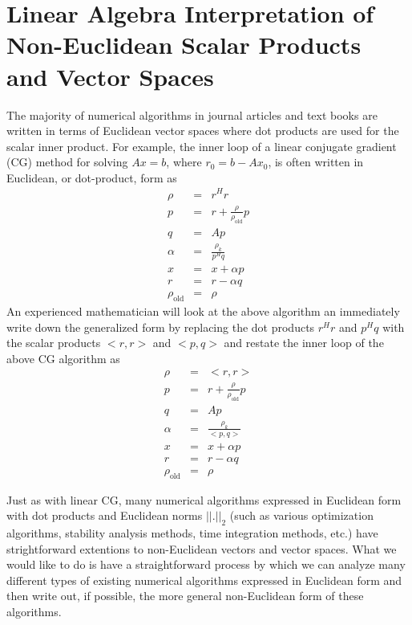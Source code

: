 \section{Linear Algebra Interpretation of Non-Euclidean Scalar Products and Vector Spaces}

The majority of numerical algorithms in journal articles and text books are
written in terms of Euclidean vector spaces where dot products are used for
the scalar inner product.  For example, the inner loop of a linear conjugate
gradient (CG) method for solving $A x = b$, where $r_0 = b - A x_0$, is often
written in Euclidean, or dot-product, form as
%
\begin{eqnarray*}
\rho & = & r^H r \\
p & = & r + \frac{\rho}{\rho_{\mbox{old}}} p \\
q & = & A p \\
\alpha & = & \frac{\rho_k}{p^H q} \\
x & = & x + \alpha p \\
r & = & r - \alpha q \\
\rho_{\mbox{old}} & = & \rho
\end{eqnarray*}
%
An experienced mathematician will look at the above algorithm an immediately
write down the generalized form by replacing the dot products $r^H r$ and $p^H
q$ with the scalar products $<r,r>$ and $<p,q>$ and restate the inner loop of
the above CG algorithm as
%
\begin{eqnarray*}
\rho & = & <r,r> \\
p & = & r + \frac{\rho}{\rho_{\mbox{old}}} p \\
q & = & A p \\
\alpha & = & \frac{\rho_k}{<p,q>} \\
x & = & x + \alpha p \\
r & = & r - \alpha q \\
\rho_{\mbox{old}} & = & \rho
\end{eqnarray*}
%

Just as with linear CG, many numerical algorithms expressed in Euclidean form
with dot products and Euclidean norms $||.||_2$ (such as various optimization
algorithms, stability analysis methods, time integration methods, etc.) have
strightforward extentions to non-Euclidean vectors and vector spaces.  What we
would like to do is have a straightforward process by which we can analyze
many different types of existing numerical algorithms expressed in Euclidean
form and then write out, if possible, the more general non-Euclidean form of
these algorithms.

